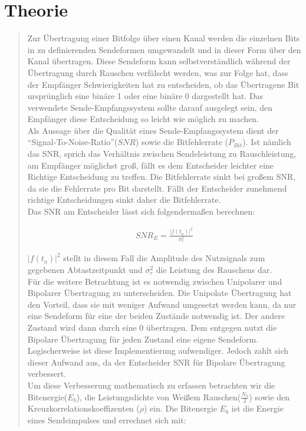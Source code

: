 \section{Theorie}
\begin{quote}

    Zur Übertragung einer Bitfolge über einen Kanal werden die einzelnen Bits in zu definierenden Sendeformen
    umgewandelt und in dieser Form über den Kanal übertragen. Diese Sendeform kann selbstverständlich während der
    Übertragung durch Rauschen verfälscht werden, was zur Folge hat, dass der
    Empfänger Schwierigkeiten hat zu entscheiden, ob das Übertragene Bit ursprünglich eine binäre 1 oder eine  binäre 0 dargestellt hat. Das verwendete
    Sende-Empfangssystem sollte darauf ausgelegt sein, den Empfänger diese Entscheidung so leicht wie möglich zu
    machen.\\
    Als Aussage über die Qualität eines Sende-Empfangssystem dient der ``Signal-To-Noise-Ratio''($SNR$) sowie die
    Bitfehlerrate ($P_{Bit}$). Ist nämlich das SNR, sprich das Verhältnis
    zwischen Sendeleistung zu Rauschleistung, am Empfänger möglichst groß, fällt
    es dem Entscheider leichter eine Richtige Entscheidung zu treffen. Die Bitfehlerrate sinkt bei großem SNR, da sie die Fehlerrate pro Bit darstellt. Fällt der Entscheider zunehmend richtige
    Entscheidungen sinkt daher die Bitfehlerrate.\\
    Das SNR am Entscheider lässt sich folgendermaßen berechnen:
    
    \begin{equation*}
    	\begin{split}
    		SNR_E = \frac{|f(t_a)|^2}{\sigma_r^2}
    	\end{split}
    \end{equation*}
    
    $|f(t_a)|^2$ stellt in diesem Fall die Amplitude des Nutzsignals zum gegebenen Abtastzeitpunkt und $\sigma_r^2$ die
    Leistung des Rauschens dar.\\
    
    Für die weitere Betrachtung ist es notwendig zwischen Unipolarer und Bipolarer Übertragung zu unterscheiden. Die
    Unipolate Übertragung hat den Vorteil, dass sie mit weniger Aufwand umgesetzt werden kann, da nur eine Sendeform für
    eine der beiden Zustände notwendig ist. Der andere Zustand wird dann durch eine 0 übertragen. Dem entgegen nutzt die
    Bipolare Übertragung für jeden Zustand eine eigene Sendeform. Logischerweise ist diese Implementierung aufwendiger.
    Jedoch zahlt sich dieser Aufwand aus, da der Entscheider SNR für Bipolare Übertragung verbessert.\\
    Um diese Verbesserung mathematisch zu erfassen betrachten wir die Bitenergie($E_b$), die Leistungsdichte von Weißem
    Rauschen($\frac{N_0}{2}$) sowie den Kreuzkorrelationskoeffizenten ($\rho$) ein. Die Bitenergie $E_b$ ist die Energie
    eines Sendeimpulses und errechnet sich mit: \cite{Bitenergie}
    

\end{quote}
